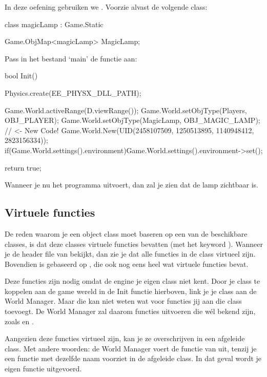 In deze oefening gebruiken we . Voorzie alvast de volgende class:

\begin{code}
class magicLamp : Game.Static {
	
}
Game.ObjMap<magicLamp> MagicLamp;
\end{code}

Pass in het bestand `main' de functie  aan:

\begin{code}
bool Init()
{
   Physics.create(EE_PHYSX_DLL_PATH);
   
   Game.World.activeRange(D.viewRange());
   Game.World.setObjType(Players, OBJ_PLAYER);
   Game.World.setObjType(MagicLamp, OBJ_MAGIC_LAMP); // <- New Code!
   Game.World.New(UID(2458107509, 1250513895, 1140948412, 2823156334));
   if(Game.World.settings().environment)Game.World.settings().environment->set();
   
   return true;
}
\end{code}

Wanneer je nu het programma uitvoert, dan zal je zien dat de lamp zichtbaar is. 

\subsection{Virtuele functies}
De reden waarom je een object class moet baseren op een van de beschikbare  classes, is dat deze classes virtuele functies bevatten (met het keyword ). Wanneer je de header file van  bekijkt, dan zie je dat alle functies in de class virtueel zijn. Bovendien is  gebaseerd op , die ook nog eens heel wat virtuele functies bevat.

Deze functies zijn nodig omdat de engine je eigen class niet kent. Door je class te koppelen aan de game wereld in de Init functie hierboven, link je je class aan de World Manager. Maar die kan niet weten wat voor functies jij aan die class toevoegt. De World Manager zal daarom functies uitvoeren die w\'el bekend zijn, zoals  en .

Aangezien deze functies virtueel zijn, kan je ze overschrijven in een afgeleide class. Met andere woorden: de World Manager voert de  functie van  uit, tenzij je een functie met dezelfde naam voorziet in de afgeleide class. In dat geval wordt je eigen functie uitgevoerd.

